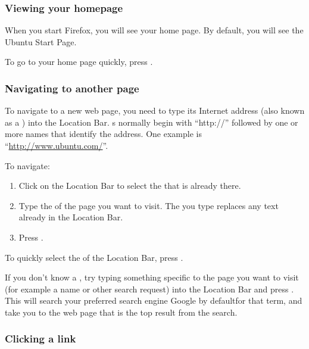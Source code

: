 \subsubsection{Viewing your homepage}

When you start Firefox, you will see your home page. By default, you will 
see the Ubuntu Start Page.

To go to your home page quickly, press .

\subsubsection{Navigating to another page}

To navigate to a new web page, you need to type its Internet address 
(also known as a ) into the Location Bar. s normally begin with 
``http://'' followed by one or more names that identify the address. 
One example is ``\url{http://www.ubuntu.com/}''.


To navigate:

\begin{enumerate}
   \item Click on the Location Bar to select the  that is already there.
   \item Type the  of the page you want to visit. The  you type 
replaces any text already in the Location Bar.
   \item Press . 
\end{enumerate}

To quickly select the  of the Location Bar, press .

If you don't know a , try typing something specific to the page you want to 
visit (for example a name or other search request) into the Location Bar and 
press . This will search your preferred search engine\dash 
Google by default\dash for that term, and take you to the web page that is
the top result from the search.

\subsubsection{Clicking a link}


